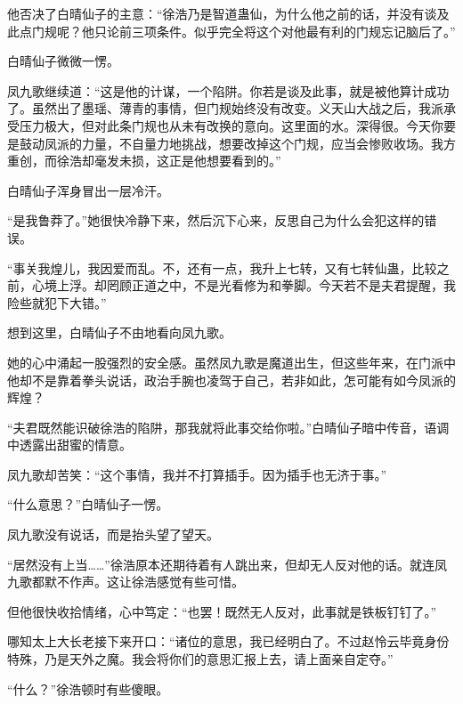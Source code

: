 \begin{this_body}
他否决了白晴仙子的主意：“徐浩乃是智道蛊仙，为什么他之前的话，并没有谈及此点门规呢？他只论前三项条件。似乎完全将这个对他最有利的门规忘记脑后了。”

白晴仙子微微一愣。

凤九歌继续道：“这是他的计谋，一个陷阱。你若是谈及此事，就是被他算计成功了。虽然出了墨瑶、薄青的事情，但门规始终没有改变。义天山大战之后，我派承受压力极大，但对此条门规也从未有改换的意向。这里面的水。深得很。今天你要是鼓动凤派的力量，不自量力地挑战，想要改掉这个门规，应当会惨败收场。我方重创，而徐浩却毫发未损，这正是他想要看到的。”

白晴仙子浑身冒出一层冷汗。

“是我鲁莽了。”她很快冷静下来，然后沉下心来，反思自己为什么会犯这样的错误。

“事关我煌儿，我因爱而乱。不，还有一点，我升上七转，又有七转仙蛊，比较之前，心境上浮。却罔顾正道之中，不是光看修为和拳脚。今天若不是夫君提醒，我险些就犯下大错。”

想到这里，白晴仙子不由地看向凤九歌。

她的心中涌起一股强烈的安全感。虽然凤九歌是魔道出生，但这些年来，在门派中他却不是靠着拳头说话，政治手腕也凌驾于自己，若非如此，怎可能有如今凤派的辉煌？

“夫君既然能识破徐浩的陷阱，那我就将此事交给你啦。”白晴仙子暗中传音，语调中透露出甜蜜的情意。

凤九歌却苦笑：“这个事情，我并不打算插手。因为插手也无济于事。”

“什么意思？”白晴仙子一愣。

凤九歌没有说话，而是抬头望了望天。

“居然没有上当……”徐浩原本还期待着有人跳出来，但却无人反对他的话。就连凤九歌都默不作声。这让徐浩感觉有些可惜。

但他很快收拾情绪，心中笃定：“也罢！既然无人反对，此事就是铁板钉钉了。”

哪知太上大长老接下来开口：“诸位的意思，我已经明白了。不过赵怜云毕竟身份特殊，乃是天外之魔。我会将你们的意思汇报上去，请上面亲自定夺。”

“什么？”徐浩顿时有些傻眼。

\end{this_body}

